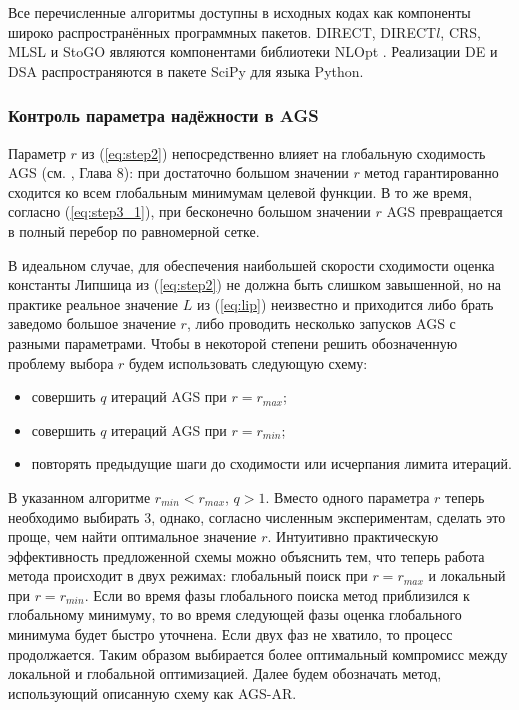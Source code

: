 Все перечисленные алгоритмы доступны в исходных кодах как компоненты широко распространённых программных пакетов.
DIRECT, DIRECT$l$, CRS, MLSL и StoGO являются компонентами библиотеки NLOpt \cite{nlopt}.
Реализации DE и DSA распространяются в пакете SciPy \cite{scipy} для языка Python.

\subsubsection{Контроль параметра надёжности в AGS}

Параметр $r$ из (\ref{eq:step2}) непосредственно влияет на глобальную сходимость AGS (см. \cite{Strongin2000}, Глава 8):
при достаточно большом значении $r$ метод гарантированно сходится ко всем глобальным минимумам целевой функции.
В то же время, согласно (\ref{eq:step3_1}), при бесконечно большом значении $r$ AGS превращается в полный перебор
по равномерной сетке.

В идеальном случае, для обеспечения наибольшей скорости сходимости оценка константы Липшица из (\ref{eq:step2})
не должна быть слишком завышенной, но на практике реальное значение $L$ из (\ref{eq:lip}) неизвестно и приходится
либо брать заведомо большое значение $r$, либо проводить несколько запусков AGS с разными параметрами. Чтобы в некоторой
степени решить обозначенную проблему выбора $r$ будем использовать следующую схему:
\begin{itemize}
  \item совершить $q$ итераций AGS при $r=r_{max}$;
  \item совершить $q$ итераций AGS при $r=r_{min}$;
  \item повторять предыдущие шаги до сходимости или исчерпания лимита итераций.
\end{itemize}

В указанном алгоритме $r_{min} < r_{max}$, $q > 1$. Вместо одного параметра $r$ теперь
необходимо выбирать 3, однако, согласно численным экспериментам, сделать это проще, чем найти оптимальное значение $r$.
Интуитивно практическую эффективность предложенной схемы можно объяснить тем, что теперь работа метода происходит в
двух режимах: глобальный поиск при $r=r_{max}$ и локальный при $r=r_{min}$. Если во время фазы глобального поиска
метод приблизился к глобальному минимуму, то во время следующей фазы оценка глобального минимума будет быстро уточнена.
Если двух фаз не хватило, то процесс продолжается. Таким образом выбирается более оптимальный компромисс
между локальной и глобальной оптимизацией. Далее будем обозначать метод, использующий описанную схему как AGS-AR.

